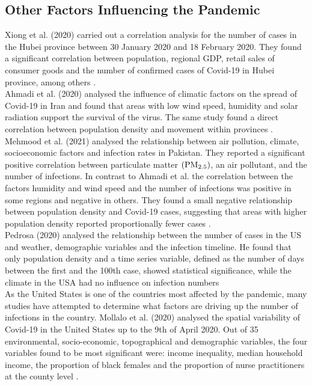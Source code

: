 \subsection*{Other Factors Influencing the Pandemic}
Xiong et al. (2020) carried out a correlation analysis for the number of cases in the Hubei province between 30 January 2020 and 18 February 2020. They found a significant correlation between population, regional GDP, retail sales of consumer goods and the number of confirmed cases of Covid-19 in Hubei province, among others \autocite[][]{xiong2020spatial}. \\
Ahmadi et al. (2020) analysed the influence of climatic factors on the spread of Covid-19 in Iran and found that areas with low wind speed, humidity and solar radiation support the survival of the virus. The same study found a direct correlation between population density and movement within provinces \autocite[][]{ahmadi2020investigation}. Mehmood et al. (2021) analysed the relationship between air pollution, climate, socioeconomic factors and infection rates in Pakistan. They reported a significant positive correlation between particulate matter $\left(\hbox{PM}_{2.5}\right)$, an air pollutant, and the number of infections. In contrast to Ahmadi et al. the correlation between the factors humidity and wind speed and the number of infections was positive in some regions and negative in others. They found a small negative relationship between population density and Covid-19 cases, suggesting that areas with higher population density reported proportionally fewer cases \autocite[][]{mehmood2021spatiotemporal}. \\
Pedrosa (2020) analysed the relationship between the number of cases in the US and weather, demographic variables and the infection timeline. He found that only population density and a time series variable, defined as the number of days between the first and the 100th case, showed statistical significance, while the climate in the USA had no influence on infection numbers \autocite[][]{pedrosa2020dynamics} \\
As the United States is one of the countries most affected by the pandemic, many studies have attempted to determine what factors are driving up the number of infections in the country. Mollalo et al. (2020) analysed the spatial variability of Covid-19 in the United States up to the 9th of April 2020. Out of 35 environmental, socio-economic, topographical and demographic variables, the four variables found to be most significant were: income inequality, median household income, the proportion of black females and the proportion of nurse practitioners at the county level \autocite[][]{mollalo2020gis}. \\
